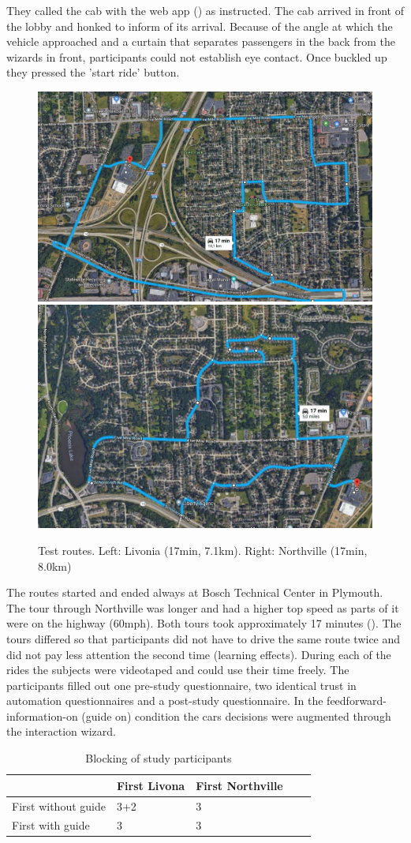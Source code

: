They called the cab with the web app () as instructed. The cab arrived in front of the lobby and honked to inform of its arrival. Because of the angle at which the vehicle approached and a curtain that separates passengers in the back from the wizards in front, participants could not establish eye contact. Once buckled up they pressed the 'start ride' button. 
\begin{figure}
     \includegraphics[height=0.31\textwidth]{fig/RouteA_Mittel.JPG}\hfill\includegraphics[height=0.31\textwidth]{fig/RouteB_Mittel.JPG}
    \caption[Test routes]{Test routes. Left: Livonia (17min, 7.1km). Right: Northville (17min, 8.0km)}
    \label{fig:routes}
\end{figure}
The routes started and ended always at Bosch Technical Center in Plymouth. The tour through Northville was longer and had a higher top speed as parts of it were on the highway (60mph). Both tours took approximately 17 minutes (). The tours differed so that participants did not have to drive the same route twice and did not pay less attention the second time (learning effects). 
During each of the rides the subjects were videotaped and could use their time freely. The participants filled out one pre-study questionnaire, two identical trust in automation questionnaires \cite{Jian2010,Koo2015} and a post-study questionnaire. In the feedforward-information-on (guide on) condition the cars decisions were augmented through the interaction wizard.

\begin{table}[]
  \caption{Blocking of study participants}
  \label{tab:blocking}

\begin{tabular}{@{}l|llll@{}}
\toprule
                    & First Livona & First Northville &  &  \\ \midrule
First without guide & 3+2          & 3                &  &  \\
First with guide    & 3            & 3                &  & 
\end{tabular}
\end{table}

